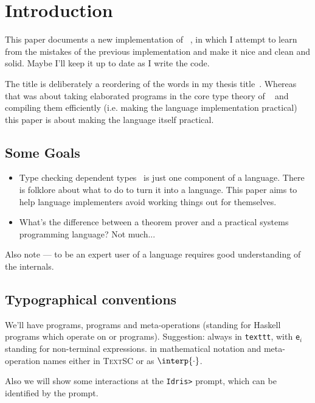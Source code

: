 \section{Introduction}

This paper documents a new implementation of \Idris{}~\cite{Brady2011a}, in which
I attempt to learn from the mistakes of the previous implementation and make
it nice and clean and solid. Maybe I'll keep it up to date as I write the
code.

The title is deliberately a reordering of the words in my thesis
title~\cite{Brady2005}. Whereas that was about taking elaborated programs
in the core type theory of \Epigram{}~\cite{McBride2004a} and compiling them
efficiently (i.e. making the language implementation practical) this paper is
about making the language itself practical. 

\subsection{Some Goals}

\begin{itemize}
\item Type checking dependent types~\cite{Chapman2005epigram,loh2010tutorial} is just one component
 of a language. There is folklore about what to do to turn it into a language. This
 paper aims to help language implementers avoid working things out for themselves.
\item What's the difference between a theorem prover and a practical systems programming
 language? Not much...
\end{itemize}

Also note --- to be an expert user of a language requires good understanding of the internals.

\subsection{Typographical conventions}

We'll have \Idris{} programs, \TT{} programs and meta-operations (standing for
Haskell programs which operate on \Idris{} or \TT{} programs). Suggestion:
\Idris{} always in \texttt{texttt}, with \texttt{e$_i$} standing for
non-terminal expressions.  \TT{} in mathematical notation and meta-operation
names either in \textsc{TextSC} or as $\interp{\cdot}$.

Also we will show some interactions at the \texttt{Idris>} prompt, which can be identified
by the prompt.
